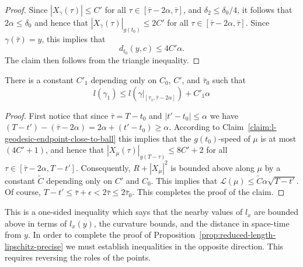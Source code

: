 \begin{proof}
\sketch
Since $|X_\gamma(\tau)|\le C'$ for all $\tau\in
[\bar\tau-2\alpha,\bar\tau]$, and  $\delta_2\le \delta_0/4$, it
follows that $2\alpha\le \delta_0$ and hence that
$|X_\gamma(\tau)|_{g(t_0)}\le 2C'$ for all  $\tau\in
[\bar\tau-2\alpha,\bar\tau]$. Since $\gamma(\bar\tau)=y$, this
implies that
$$d_{t_0}(y,c)\le 4C'\alpha.$$
The claim then follows from the triangle inequality.
\end{proof}

\begin{claim}\label{claim:l-length-concatenation-bound}
There is a constant $C'_1$ depending only on
$C_0$, $C'$, and $\bar\tau_0$ such that
$$l(\gamma_1)\le l(\gamma|_{[\tau_1,\bar\tau-2\alpha]})+C'_1\alpha$$
\end{claim}

\begin{proof}
\sketch
First notice that since $\bar\tau=T-t_0$ and $|t'-t_0|\le \alpha$ we have
$(T-t')-(\bar\tau-2\alpha)=2\alpha+(t'-t_0)\ge \alpha$. According to
Claim~\ref{claim:l-geodesic-endpoint-close-to-ball} this implies that the $g(t_0)$-speed of $\mu$ is at most
$(4C'+1)$, and hence  that $|X_{\mu}(\tau)|_{g(T-\tau)}\le 8C'+2$ for all
$\tau\in [\bar\tau-2\alpha,T-t']$. Consequently, $R+|X_\mu|^2$ is bounded above
along $\mu$ by a constant $\widetilde C$ depending only on $C'$ and $C_0$. This
implies that ${\mathcal L}(\mu)\le \widetilde C\alpha\sqrt{T-t'}$. Of course,
$T-t'\le \bar\tau+\epsilon<2\bar\tau\le 2\bar\tau_0$. This completes the proof
of the claim.
\end{proof}

This is a one-sided inequality which says that the nearby values of
$l_x$ are bounded above in terms of  $l_x(y)$, the curvature bounds,
and the distance in space-time from $y$. In order to complete the
proof of Proposition~\ref{prop:reduced-length-lipschitz-precise} we must establish inequalities in
the opposite direction. This requires reversing the roles of the
points.


